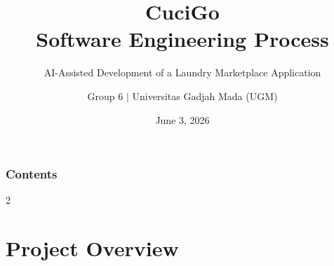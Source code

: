 \documentclass[aspectratio=169,professionalfonts,10pt]{beamer}
\title{CuciGo \\ Software Engineering Process}
\subtitle{AI-Assisted Development of a Laundry Marketplace Application}
\author{Group 6 $|$ Universitas Gadjah Mada (UGM)}
\date{June 3, 2026}
\begin{document}
\begin{frame}[plain]
    \titlepage
\end{frame}

\begin{frame}
    \frametitle{Contents}
    \begin{multicols}{2}
        \tableofcontents
    \end{multicols}
\end{frame}

\section{Project Overview}
\end{document}

